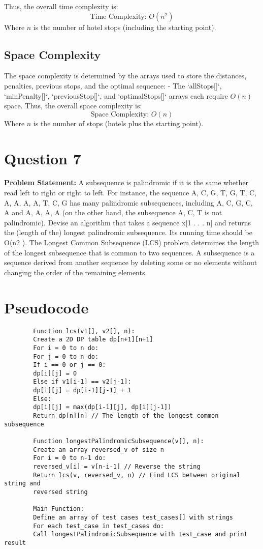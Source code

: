 \documentclass[a4paper,12pt]{report}
\begin{document}
Thus, the overall time complexity is:
\[
\text{Time Complexity: } O(n^2)
\]
Where \(n\) is the number of hotel stops (including the starting point).

\subsection*{Space Complexity}

The space complexity is determined by the arrays used to store the distances, penalties, previous stops, and the optimal sequence:
- The `allStops[]`, `minPenalty[]`, `previousStop[]`, and `optimalStops[]` arrays each require \(O(n)\) space.
Thus, the overall space complexity is:
\[
\text{Space Complexity: } O(n)
\]
Where \(n\) is the number of stops (hotels plus the starting point).

\newpage
\section*{Question 7}
\textbf{Problem Statement:} 
A subsequence is palindromic if it is the same whether read left to right or right to left. For instance, the sequence A, C, G, T, G, T, C, A, A, A, A, T, C, G has many palindromic subsequences, including A, C, G, C, A and A, A, A, A (on the other hand, the subsequence A, C, T
is not palindromic). Devise an algorithm that takes a sequence x[1 . . . n] and returns the (length of the) longest palindromic subsequence. Its running time should be O(n2 ). The Longest Common Subsequence (LCS) problem determines the length of the longest subsequence that is common to two sequences. A subsequence is a sequence derived from another sequence by deleting some or no elements without changing the order of the remaining elements. 

\section*{Pseudocode}

\begin{tcolorbox}[colback=white, colframe=black, boxrule=0.5pt]
	\ttfamily\small
	\begin{verbatim}
		Function lcs(v1[], v2[], n):
		Create a 2D DP table dp[n+1][n+1]
		For i = 0 to n do:
		For j = 0 to n do:
		If i == 0 or j == 0:
		dp[i][j] = 0
		Else if v1[i-1] == v2[j-1]:
		dp[i][j] = dp[i-1][j-1] + 1
		Else:
		dp[i][j] = max(dp[i-1][j], dp[i][j-1])
		Return dp[n][n] // The length of the longest common subsequence
		
		Function longestPalindromicSubsequence(v[], n):
		Create an array reversed_v of size n
		For i = 0 to n-1 do:
		reversed_v[i] = v[n-i-1] // Reverse the string
		Return lcs(v, reversed_v, n) // Find LCS between original string and
		reversed string
	
		Main Function:
		Define an array of test cases test_cases[] with strings
		For each test_case in test_cases do:
		Call longestPalindromicSubsequence with test_case and print result
	\end{verbatim}
\end{tcolorbox}
\end{document}
